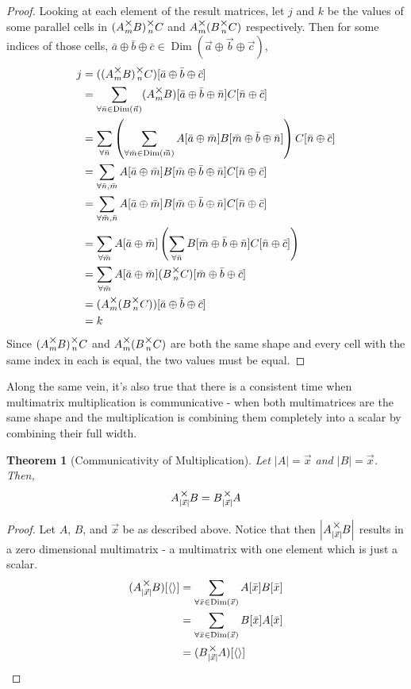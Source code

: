 \documentclass[12pt]{book}
\theoremstyle{plain}
\newtheorem{theorem}{Theorem}[chapter]
\theoremstyle{definition}
\theoremstyle{ppart}
\theoremstyle{case}
\theoremstyle{solution}
\DeclareMathOperator{\Dim}{Dim}
\newcommand{\mmult}[1]{\text{\raisebox{1ex}{$\underset{#1}{\times}$}}}
\newcommand{\shape}[1]{\left|#1\right|}
\begin{document}
\begin{proof}
Looking at each element of the result matrices, let $j$ and $k$ be the values
of some parallel cells in $(A \mmult{m} B) \mmult{n} C$ and
$A \mmult{m} (B \mmult{n} C)$ respectively. Then for some indices of those cells,
$\bar{a} \oplus \bar{b} \oplus \bar{c} \in
\Dim(\vec{a} \oplus \vec{b} \oplus \vec{c})$,
\begin{align*}
 j
 &= ((A \mmult{m} B) \mmult{n} C)[\bar{a} \oplus \bar{b} \oplus \bar{c}] \\
 &= \sum_{\forall \bar{n} \in \Dim(\vec{n})}
 (A \mmult{m} B)[\bar{a} \oplus \bar{b} \oplus \bar{n}]
 C[\bar{n} \oplus \bar{c}] \\
 &= \sum_{\forall \bar{n}}
 \left(
  \sum_{\forall \bar{m} \in \Dim(\vec{m})}
  A[\bar{a} \oplus \bar{m}]B[\bar{m} \oplus \bar{b} \oplus \bar{n}]
 \right)
 C[\bar{n} \oplus \bar{c}] \\
 &= \sum_{\forall \bar{n}, \bar{m}}
 A[\bar{a} \oplus \bar{m}]
 B[\bar{m} \oplus \bar{b} \oplus \bar{n}]
 C[\bar{n} \oplus \bar{c}] \\
 &= \sum_{\forall \bar{m}, \bar{n}}
 A[\bar{a} \oplus \bar{m}]
 B[\bar{m} \oplus \bar{b} \oplus \bar{n}]
 C[\bar{n} \oplus \bar{c}] \\
 &= \sum_{\forall \bar{m}}
 A[\bar{a} \oplus \bar{m}]
 \left(
 \sum_{\forall \bar{n}}
  B[\bar{m} \oplus \bar{b} \oplus \bar{n}]
  C[\bar{n} \oplus \bar{c}]
 \right) \\
 &= \sum_{\forall \bar{m}}
 A[\bar{a} \oplus \bar{m}]
 (B \mmult{n} C)[\bar{m} \oplus \bar{b} \oplus \bar{c}] \\
 &= (A \mmult{m} (B \mmult{n} C))[\bar{a} \oplus \bar{b} \oplus \bar{c}] \\
 &= k
\end{align*}
Since $(A \mmult{m} B) \mmult{n} C$ and $A \mmult{m} (B \mmult{n} C)$ are both
the same shape and every cell with the same index in each is equal, the two
values must be equal.
\end{proof}

Along the same vein, it's also true that there is a consistent time when
multimatrix multiplication is communicative - when both multimatrices are
the same shape and the multiplication is combining them completely into a
scalar by combining their full width.

\begin{theorem}[Communicativity of Multiplication]
Let $\shape{A} = \vec{x}$ and $\shape{B} = \vec{x}$. Then,
\[ A \mmult{\shape{\vec{x}}} B = B \mmult{\shape{\vec{x}}} A \]
\end{theorem}
\begin{proof}
Let $A$, $B$, and $\vec{x}$ be as described above. Notice that then $\shape{A \mmult{\shape{\vec{x}}} B}$
results in a zero dimensional multimatrix - a multimatrix with one element which is just a scalar.
\begin{align*}
(A \mmult{\shape{\vec{x}}} B)[\left<\right>]
  &= \sum_{\forall \bar{x} \in \Dim(\vec{x})} A[\bar{x}]B[\bar{x}] \\
  &= \sum_{\forall \bar{x} \in \Dim(\vec{x})} B[\bar{x}]A[\bar{x}] \\
  &= (B \mmult{\shape{\vec{x}}} A)[\left<\right>]
\end{align*}
\end{proof}
\end{document}

